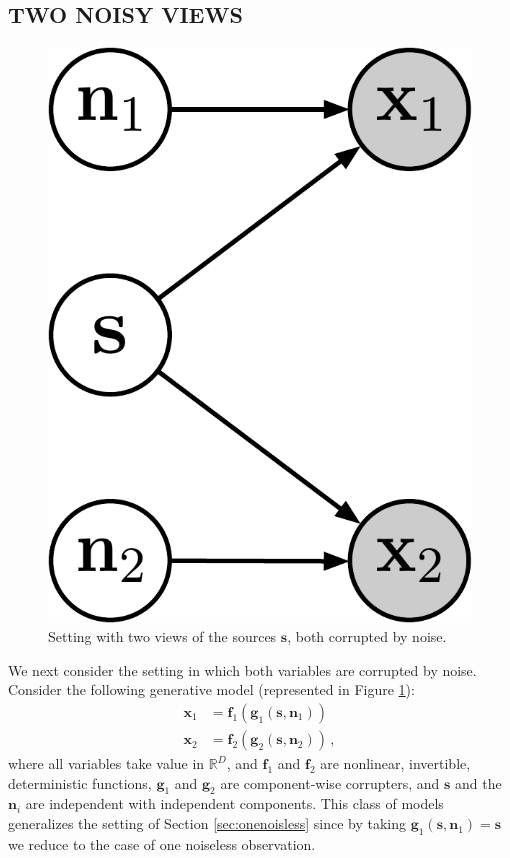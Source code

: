 \documentclass[letterpaper]{article}
\theoremstyle{definition}
\begin{document}
\subsection{TWO NOISY VIEWS}
\label{sec:constrained}

\begin{figure}[t!]
    \centering
    \includegraphics[scale=0.3]{img_pdf/classic_hsr.pdf}
    \caption{Setting with two views of the sources $\bm{s}$, both corrupted by noise.}
    \label{fig:classic_hsr}
\end{figure}

We next consider the setting in which both variables are corrupted by noise.
Consider the following generative model (represented in Figure \ref{fig:classic_hsr}):
\begin{align*}
\bm{x}_{1}&=\bm{f}_{1}(\bm{g}_{1}(\bm{s},\bm{n}_{1}))  \\
\bm{x}_{2}&=\bm{f}_{2}(\bm{g}_{2}(\bm{s},\bm{n}_{2}))  \,,
\end{align*}
where all variables take value in $\mathbb{R}^D$, and $\bm{f}_{1}$ and $\bm{f}_{2}$ are nonlinear, invertible, deterministic functions,
$\bm{g}_{1}$ and $\bm{g}_{2}$ are component-wise corrupters, and $\bm{s}$ and the $\bm{n}_i$ are independent with independent components.
This class of models generalizes the setting of Section \ref{sec:onenoisless} since by taking $\bm{g}_1(\bm{s}, \bm{n}_1) = \bm{s}$ we reduce to the case of one noiseless observation.
\end{document}
